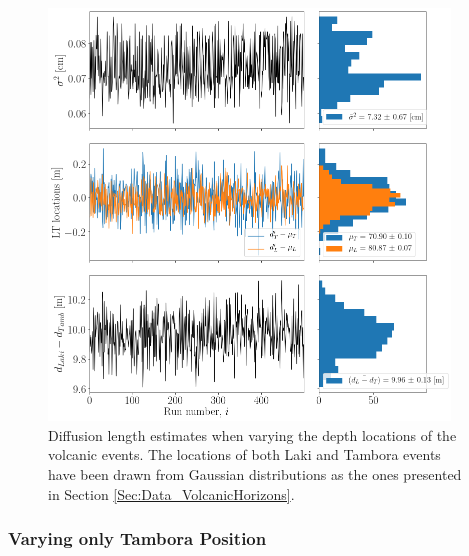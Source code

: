 \documentclass[../../CompleteThesis2/Complete_2ndDraft]{subfiles}
\begin{document}
\begin{figure}[h]
	\centering
	\includegraphics[width=0.95\textwidth]{SiteA_Vary_LandT.png}
	\caption[Diffusion Length Variations, Varying Laki and Tambora]{\small Diffusion length estimates when varying the depth locations of the volcanic events. The locations of both Laki and Tambora events have been drawn from Gaussian distributions as the ones presented in Section \ref{Sec:Data_VolcanicHorizons}.}
	\label{fig:SiteA_Vary_LandT}
\end{figure}



\subsubsection[Vary T]{Varying only Tambora Position}
\label{Subsubsec:Method_TestStab_LTlocations_T}
\end{document}
